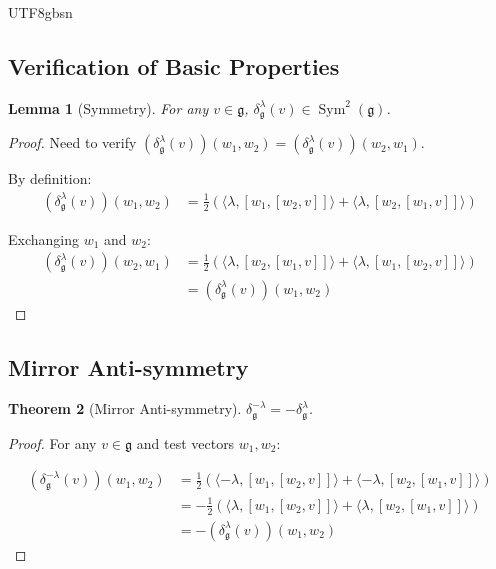 \documentclass[a4paper,12pt]{extarticle}
\newtheorem{theorem}{Theorem}[section]
\newtheorem{lemma}[theorem]{Lemma}
\theoremstyle{definition}
\begin{document}
\begin{CJK}{UTF8}{gbsn}
\subsection{Verification of Basic Properties}
\label{subsec:basic_properties_verification}

\begin{lemma}[Symmetry]
\label{lem:symmetry_verification}
For any $v \in \mathfrak{g}$, $\delta^\lambda_\mathfrak{g}(v) \in \operatorname{Sym}^2(\mathfrak{g})$.
\end{lemma}

\begin{proof}
Need to verify $(\delta^\lambda_\mathfrak{g}(v))(w_1, w_2) = (\delta^\lambda_\mathfrak{g}(v))(w_2, w_1)$.

By definition:
\begin{align}
(\delta^\lambda_\mathfrak{g}(v))(w_1, w_2) &= \frac{1}{2} \left( \langle \lambda, [w_1, [w_2, v]] \rangle + \langle \lambda, [w_2, [w_1, v]] \rangle \right)
\end{align}

Exchanging $w_1$ and $w_2$:
\begin{align}
(\delta^\lambda_\mathfrak{g}(v))(w_2, w_1) &= \frac{1}{2} \left( \langle \lambda, [w_2, [w_1, v]] \rangle + \langle \lambda, [w_1, [w_2, v]] \rangle \right) \\
&= (\delta^\lambda_\mathfrak{g}(v))(w_1, w_2)
\end{align}
\end{proof}

\subsection{Mirror Anti-symmetry}
\label{subsec:mirror_antisymmetry}

\begin{theorem}[Mirror Anti-symmetry]
\label{thm:mirror_antisymmetry}
$\delta^{-\lambda}_\mathfrak{g} = -\delta^\lambda_\mathfrak{g}$.
\end{theorem}

\begin{proof}
For any $v \in \mathfrak{g}$ and test vectors $w_1, w_2$:

\begin{align}
(\delta^{-\lambda}_\mathfrak{g}(v))(w_1, w_2) &= \frac{1}{2} \left( \langle -\lambda, [w_1, [w_2, v]] \rangle + \langle -\lambda, [w_2, [w_1, v]] \rangle \right) \\
&= -\frac{1}{2} \left( \langle \lambda, [w_1, [w_2, v]] \rangle + \langle \lambda, [w_2, [w_1, v]] \rangle \right) \\
&= -(\delta^\lambda_\mathfrak{g}(v))(w_1, w_2)
\end{align}


\end{proof}
\end{CJK}
\end{document}
